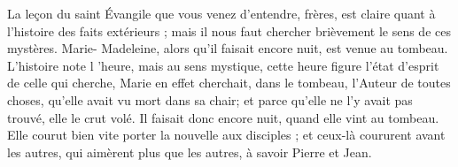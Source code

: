  La leçon du saint Évangile que vous venez d’entendre, frères, est claire quant à l’histoire des faits extérieurs ; mais il nous faut chercher brièvement le sens de ces mystères. Marie- Madeleine, alors qu'il faisait encore nuit, est venue au tombeau. L’histoire note l ’heure, mais au sens mystique, cette heure figure l’état d’esprit de celle qui cherche, Marie en effet cherchait, dans le tombeau, l’Auteur de toutes choses, qu’elle avait vu mort dans sa chair; et parce qu’elle ne l’y avait pas trouvé, elle le crut volé. Il faisait donc encore nuit, quand elle vint au tombeau. Elle courut bien vite porter la nouvelle aux disciples ; et ceux-là coururent avant les autres, qui aimèrent plus que les autres, à savoir Pierre et Jean.